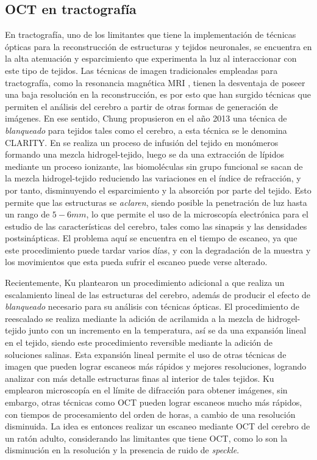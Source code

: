 \subsection{OCT en tractografía}
\label{sec:oct_tractography}

En tractografía, uno de los limitantes que tiene la implementación de técnicas ópticas para la reconstrucción de estructuras y tejidos neuronales, se encuentra en la alta atenuación y esparcimiento que experimenta la luz al interaccionar con este tipo de tejidos. Las técnicas de imagen tradicionales empleadas para tractografía, como la resonancia magnética MRI \cite{Basser2000}, tienen la desventaja de poseer una baja resolución en la reconstrucción, es por esto que han surgido técnicas que permiten el análisis del cerebro a partir de otras formas de generación de imágenes. En ese sentido, Chung \etal \cite{Chung2013} propusieron en el año 2013 una técnica de \emph{blanqueado} para tejidos tales como el cerebro, a esta técnica se le denomina {CLARITY}. En \CLARITY se realiza un proceso de infusión del tejido en monómeros formando una mezcla hidrogel-tejido, luego se da una extracción de lípidos mediante un proceso ionizante, las biomoléculas sin grupo funcional se sacan de la mezcla hidrogel-tejido reduciendo las variaciones en el índice de refracción, y por tanto, disminuyendo el esparcimiento y la absorción por parte del tejido. Esto permite que las estructuras se \textit{aclaren}, siendo posible la penetración de luz hasta un rango de $5-6mm$, lo que permite el uso de la microscopía electrónica para el estudio de las características del cerebro, tales como las sinapsis y las densidades postsinápticas. El problema aquí se encuentra en el tiempo de escaneo, ya que este procedimiento puede tardar varios días, y con la degradación de la muestra y los movimientos que esta pueda sufrir el escaneo puede verse alterado. 

Recientemente, Ku \etal \cite{Ku2016} plantearon un procedimiento adicional a \CLARITY que realiza un escalamiento lineal de las estructuras del cerebro, además de producir el efecto de \emph{blanqueado} necesario para su análisis con técnicas ópticas. El procedimiento de reescalado se realiza mediante la adición de acrilamida a la mezcla de hidrogel-tejido junto con un incremento en la temperatura, así se da una expansión lineal en el tejido, siendo este procedimiento reversible mediante la adición de soluciones salinas. Esta expansión lineal permite el uso de otras técnicas de imagen que pueden lograr escaneos más rápidos y mejores resoluciones, logrando analizar con más detalle estructuras finas al interior de tales tejidos. Ku \etal emplearon microscopía en el límite de difracción para obtener imágenes, sin embargo, otras técnicas como OCT pueden lograr escaneos mucho más rápidos, con tiempos de procesamiento del orden de horas, a cambio de una resolución disminuida. La idea es entonces realizar un escaneo mediante OCT del cerebro de un ratón adulto, considerando las limitantes que tiene OCT, como lo son la disminución en la resolución y la presencia de ruido de \textit{speckle}.

